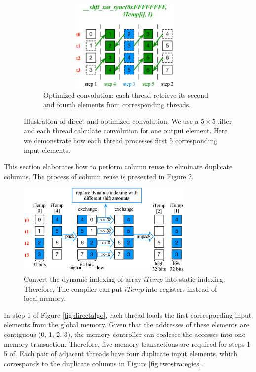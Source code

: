 \begin{figure}
\begin{subfigure}{0.3\textwidth}
		 \includegraphics[width=0.96\textwidth,height=4.5cm]{./figure/optalgo2.eps}
		 \caption{Optimized convolution: each thread retrieve its second and fourth elements from corresponding threads.}
		 \label{fig:optalgo2}
	\end{subfigure}
  \caption{Illustration of direct and optimized convolution. We use a $5 \times 5$ filter  and each thread calculate convolution for one output element. Here we demonstrate how each thread processes first 5 corresponding input elements.}
   \label{fig:corealgo}
\end{figure}

This section elaborates how to perform column reuse to eliminate duplicate columns. The process of column reuse is presented in Figure \ref{fig:corealgo}.%

\begin{figure}
	\centering
	\includegraphics[width=\columnwidth,height=4.5cm]{./figure/exchange.eps}
\caption{Convert the dynamic indexing of array $iTemp$ into static indexing. Therefore, The compiler can put $iTemp$ into registers instead of local memory.}
\label{fig:exchange}
\end{figure}


In step 1 of Figure \ref{fig:directalgo}, each thread loads the first corresponding input elements from the global memory. Given that the addresses of these elements are contiguous (0, 1, 2, 3), the memory controller can coalesce the accesses into one memory transaction. Therefore, five
memory transactions are required for steps 1-5 of. Each pair of adjacent threads have four duplicate input
elements, which corresponds to the duplicate columns in Figure \ref{fig:twostrategies}. 

